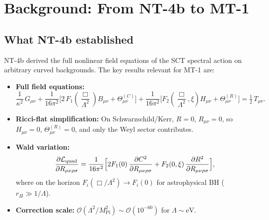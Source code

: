 \documentclass[12pt,a4paper]{article}
\theoremstyle{definition}
\theoremstyle{remark}
\begin{document}
\tableofcontents
\newpage

\section{Background: From NT-4b to MT-1}
\label{sec:background}

\subsection{What NT-4b established}

NT-4b derived the full nonlinear field equations of the SCT spectral action
on arbitrary curved backgrounds.  The key results relevant for MT-1 are:

\begin{itemize}[nosep]
  \item \textbf{Full field equations:}
    \begin{equation}\label{eq:full-eom}
      \frac{1}{\kappa^2}\,G_{\mu\nu}
      + \frac{1}{16\pi^2}\bigl[2\,F_1\!\left(\frac{\Box}{\Lambda^2}\right)
      B_{\mu\nu} + \Theta^{(C)}_{\mu\nu}\bigr]
      + \frac{1}{16\pi^2}\bigl[F_2\!\left(\frac{\Box}{\Lambda^2},\xi\right)
      H_{\mu\nu} + \Theta^{(R)}_{\mu\nu}\bigr]
      = \tfrac{1}{2}\,T_{\mu\nu}.
    \end{equation}
  \item \textbf{Ricci-flat simplification:} On Schwarzschild/Kerr,
    $R = 0$, $R_{\mu\nu} = 0$, so $H_{\mu\nu} = 0$,
    $\Theta^{(R)}_{\mu\nu} = 0$, and only the Weyl sector contributes.
  \item \textbf{Wald variation:}
    \begin{equation}\label{eq:wald-variation-nt4b}
      \frac{\partial\mathcal{L}_{\mathrm{quad}}}{\partial R_{\mu\nu\rho\sigma}}
      = \frac{1}{16\pi^2}\Bigl[
        2F_1(0)\,\frac{\partial C^2}{\partial R_{\mu\nu\rho\sigma}}
        + F_2(0,\xi)\,\frac{\partial R^2}{\partial R_{\mu\nu\rho\sigma}}
      \Bigr],
    \end{equation}
    where on the horizon $F_i(\Box/\Lambda^2) \to F_i(0)$ for
    astrophysical BH ($r_H \gg 1/\Lambda$).
  \item \textbf{Correction scale:}
    $\mathcal{O}(\Lambda^2/M_{\mathrm{Pl}}^2) \sim
    \mathcal{O}(10^{-60})$ for $\Lambda \sim \mathrm{eV}$.
\end{itemize}
\end{document}
